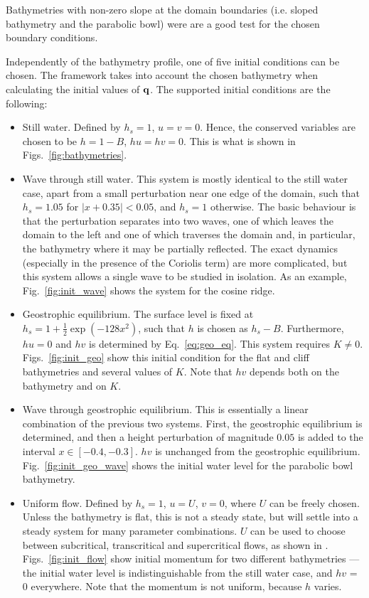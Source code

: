Bathymetries with non-zero slope at the domain boundaries (i.e. sloped bathymetry and the parabolic bowl) were are a good test for the chosen boundary conditions.

Independently of the bathymetry profile, one of five initial conditions can be chosen. The framework takes into account the chosen bathymetry when calculating the initial values of $\vb q$. The supported initial conditions are the following:

\begin{itemize}
  \item Still water. Defined by $h_s = 1$, $u = v = 0$. Hence, the conserved variables are chosen to be $h = 1 - B$, $hu = hv = 0$. This is what is shown in Figs.~\ref{fig:bathymetries}.
  \item Wave through still water. This system is mostly identical to the still water case, apart from a small perturbation near one edge of the domain, such that $h_s = 1.05$ for $|x + 0.35| < 0.05$, and $h_s = 1$ otherwise. The basic behaviour is that the perturbation separates into two waves, one of which leaves the domain to the left and one of which traverses the domain and, in particular, the bathymetry where it may be partially reflected. The exact dynamics (especially in the presence of the Coriolis term) are more complicated, but this system allows a single wave to be studied in isolation. As an example, Fig.~\ref{fig:init_wave} shows the system for the cosine ridge.
  \item Geostrophic equilibrium. The surface level is fixed at $h_s = 1 + \frac{1}{2} \exp (-128 x^2)$, such that $h$ is chosen as $h_s - B$. Furthermore, $hu = 0$ and $hv$ is determined by Eq.~\ref{eq:geo_eq}. This system requires $K \neq 0$. Figs.~\ref{fig:init_geo} show this initial condition for the flat and cliff bathymetries and several values of $K$. Note that $hv$ depends both on the bathymetry and on $K$.
  \item Wave through geostrophic equilibrium. This is essentially a linear combination of the previous two systems. First, the geostrophic equilibrium is determined, and then a height perturbation of magnitude $0.05$ is added to the interval $x \in [-0.4, -0.3]$. $hv$ is unchanged from the geostrophic equilibrium. Fig.~\ref{fig:init_geo_wave} shows the initial water level for the parabolic bowl bathymetry.
  \item Uniform flow. Defined by $h_s = 1$, $u = U$, $v = 0$, where $U$ can be freely chosen. Unless the bathymetry is flat, this is not a steady state, but will settle into a steady system for many parameter combinations. $U$ can be used to choose between subcritical, transcritical and supercritical flows, as shown in \cite{esler2005steady}. Figs.~\ref{fig:init_flow} show initial momentum for two different bathymetries --- the initial water level is indistinguishable from the still water case, and $hv$ = 0 everywhere. Note that the momentum is not uniform, because $h$ varies.
\end{itemize}

